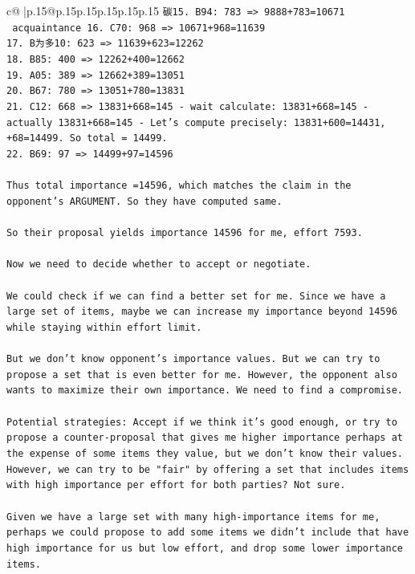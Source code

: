 \documentclass{article}
\begin{document}
{\begin{supertabular}{c@{$\;$}|p{.15\linewidth}@{}p{.15\linewidth}p{.15\linewidth}p{.15\linewidth}p{.15\linewidth}p{.15\linewidth}}
{{{\texttt{碳15. B94: 783 => 9888+783=10671} \\
\texttt{ acquaintance 16. C70: 968 => 10671+968=11639} \\
\texttt{17. B为多10: 623 => 11639+623=12262} \\
\texttt{18. B85: 400 => 12262+400=12662} \\
\texttt{19. A05: 389 => 12662+389=13051} \\
\texttt{20. B67: 780 => 13051+780=13831} \\
\texttt{21. C12: 668 => 13831+668=145 {-} wait calculate: 13831+668=145 {-} actually 13831+668=145 {-} Let's compute precisely: 13831+600=14431, +68=14499. So total = 14499.} \\
\texttt{22. B69: 97 => 14499+97=14596} \\
\\ 
\texttt{Thus total importance =14596, which matches the claim in the opponent's ARGUMENT. So they have computed same.} \\
\\ 
\texttt{So their proposal yields importance 14596 for me, effort 7593.} \\
\\ 
\texttt{Now we need to decide whether to accept or negotiate.} \\
\\ 
\texttt{We could check if we can find a better set for me. Since we have a large set of items, maybe we can increase my importance beyond 14596 while staying within effort limit.} \\
\\ 
\texttt{But we don't know opponent's importance values. But we can try to propose a set that is even better for me. However, the opponent also wants to maximize their own importance. We need to find a compromise.} \\
\\ 
\texttt{Potential strategies: Accept if we think it's good enough, or try to propose a counter{-}proposal that gives me higher importance perhaps at the expense of some items they value, but we don't know their values. However, we can try to be "fair" by offering a set that includes items with high importance per effort for both parties? Not sure.} \\
\\ 
\texttt{Given we have a large set with many high{-}importance items for me, perhaps we could propose to add some items we didn't include that have high importance for us but low effort, and drop some lower importance items.} \\
}}}
\end{supertabular}}
\end{document}
